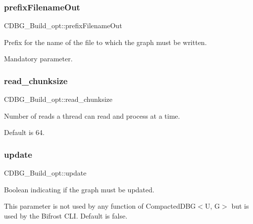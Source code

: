 \subsubsection{\texorpdfstring{prefix\+Filename\+Out}{prefixFilenameOut}}
{\footnotesize\ttfamily C\+D\+B\+G\+\_\+\+Build\+\_\+opt\+::prefix\+Filename\+Out}



Prefix for the name of the file to which the graph must be written. 

Mandatory parameter. \mbox{\label{structCDBG__Build__opt_ae788b89a3eeca15411c1c01d1e47736e}} 
\subsubsection{\texorpdfstring{read\+\_\+chunksize}{read\_chunksize}}
{\footnotesize\ttfamily C\+D\+B\+G\+\_\+\+Build\+\_\+opt\+::read\+\_\+chunksize}



Number of reads a thread can read and process at a time. 

Default is 64. \mbox{\label{structCDBG__Build__opt_a19fd0874dfc472a56d5c7bf375d849e8}} 
\subsubsection{\texorpdfstring{update}{update}}
{\footnotesize\ttfamily C\+D\+B\+G\+\_\+\+Build\+\_\+opt\+::update}



Boolean indicating if the graph must be updated. 

This parameter is not used by any function of Compacted\+D\+B\+G$<$\+U, G$>$ but is used by the Bifrost C\+LI. Default is false. \mbox{\label{structCDBG__Build__opt_a6986d2570dc42f602b4ed884ff5b9084}} 
